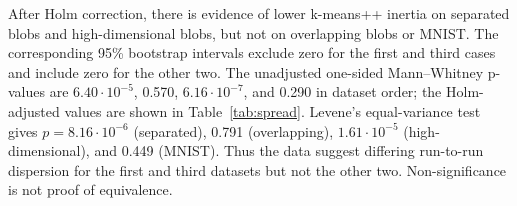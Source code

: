 \documentclass[10pt,a4paper]{article}
\begin{document}
\begin{table}[H]
\centering\scriptsize
\caption{Inertia distribution and random-start comparison. Difference is mean(k-means++) minus mean(random); the interval is a 95\% percentile bootstrap CI. Holm-adjusted $p$ covers the four one-sided Mann--Whitney tests.}
\label{tab:spread}
\end{table}

After Holm correction, there is evidence of lower k-means++ inertia on separated blobs and high-dimensional blobs, but not on overlapping blobs or MNIST. The corresponding 95\% bootstrap intervals exclude zero for the first and third cases and include zero for the other two. The unadjusted one-sided Mann--Whitney p-values are $6.40\cdot10^{-5}$, 0.570, $6.16\cdot10^{-7}$, and 0.290 in dataset order; the Holm-adjusted values are shown in Table~\ref{tab:spread}. Levene's equal-variance test gives $p=8.16\cdot10^{-6}$ (separated), 0.791 (overlapping), $1.61\cdot10^{-5}$ (high-dimensional), and 0.449 (MNIST). Thus the data suggest differing run-to-run dispersion for the first and third datasets but not the other two. Non-significance is not proof of equivalence.
\end{document}
